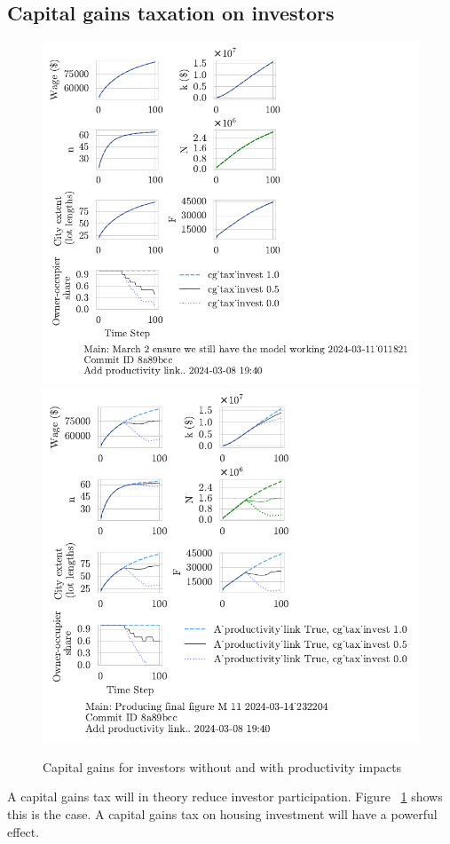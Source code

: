 \subsection{Capital gains taxation on investors}
\begin{figure}[h!tb] 
    \centering
    \includegraphics[scale=.75, trim={0 1.4cm 4.5cm 0},clip]{fig/cg_tax_invest-Main-011821.pdf} 
    \includegraphics[scale=.75, trim={0 1.4cm 3.7cm 0},clip]{fig/With-productivity_linkcg_tax_invest-232204.pdf} 
    \caption{Capital gains for investors without and with productivity impacts}
    \label{fig:CG-invest_link_W-WO-Cost-of-capital}
\end{figure}
A capital gains tax will in theory reduce investor participation. Figure ~\ref{fig:CG-invest_link_W-WO-Cost-of-capital} shows this is the case. A capital gains tax on housing investment will have a powerful effect.

